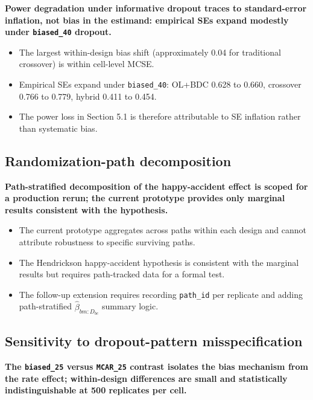 \documentclass[
  11pt,
]{article}
\begin{document}
\textbf{Power degradation under informative dropout traces to standard-error inflation, not bias in the estimand: empirical SEs expand modestly under \texttt{biased\_40} dropout.}

\begin{itemize}\setlength{\itemsep}{2pt}\setlength{\parskip}{0pt}
\item The largest within-design bias shift (approximately 0.04 for traditional crossover) is within cell-level MCSE.
\item Empirical SEs expand under \texttt{biased\_40}: OL+BDC 0.628 to 0.660, crossover 0.766 to 0.779, hybrid 0.411 to 0.454.
\item The power loss in Section 5.1 is therefore attributable to SE inflation rather than systematic bias.
\end{itemize}

\subsection{Randomization-path decomposition}\label{randomization-path-decomposition}

\textbf{Path-stratified decomposition of the happy-accident effect is scoped for a production rerun; the current prototype provides only marginal results consistent with the hypothesis.}

\begin{itemize}\setlength{\itemsep}{2pt}\setlength{\parskip}{0pt}
\item The current prototype aggregates across paths within each design and cannot attribute robustness to specific surviving paths.
\item The Hendrickson happy-accident hypothesis is consistent with the marginal results but requires path-tracked data for a formal test.
\item The follow-up extension requires recording \texttt{path\_id} per replicate and adding path-stratified $\hat\beta_{bm:D_{bc}}$ summary logic.
\end{itemize}

\subsection{Sensitivity to dropout-pattern misspecification}\label{sensitivity-to-dropout-pattern-misspecification}

\textbf{The \texttt{biased\_25} versus \texttt{MCAR\_25} contrast isolates the bias mechanism from the rate effect; within-design differences are small and statistically indistinguishable at 500 replicates per cell.}
\end{document}
